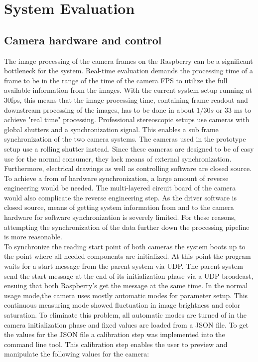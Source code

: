 \chapter{System Evaluation}
\section{Camera hardware and control}
The image processing of the camera frames on the Raspberry can be a significant bottleneck for the system. Real-time evaluation demands the processing time of a frame to be in the range of the time of the camera FPS to utilize the full available information from the images. With the current system setup running at 30fps, this means that the image processing time, containing frame readout and downstream processing of the images, has to be done in about $1/30s$ or 33 ms to achieve "real time" processing. Professional stereoscopic setups use cameras with global shutters and a synchronization signal. This enables a sub frame synchronization of the two camera systems. The cameras used in the prototype setup use a rolling shutter instead. Since these cameras are designed to be of easy use for the normal consumer, they lack means of external synchronization. Furthermore, electrical drawings as well as controlling software are closed source. To achieve a from of hardware synchronization, a large amount of reverse engineering would be needed. The multi-layered circuit board of the camera would also complicate the reverse engineering step. As the driver software is closed source, means of getting system information from and to the camera hardware for software synchronization is severely limited. For these reasons, attempting the synchronization of the data further down the processing pipeline is more reasonable.
\\To synchronize the reading start point of both cameras the system boots up to the point where all needed components are initialized. At this point the program waits for a start message from the parent system via UDP. The parent system send the start message at the end of its initialization phase via a UDP broadcast, ensuing that both Raspberry's get the message at the same time.
In the normal usage mode,the camera uses mostly automatic modes for parameter setup. This continuous measuring mode showed fluctuation in image brightness and color saturation. To eliminate this problem, all automatic modes are turned of in the camera initialization phase and fixed values are loaded from a JSON file. To get the values for the JSON file a calibration step was implemented into the command line tool. \newpage This calibration step enables the user to preview and manipulate the  following values for the camera:
